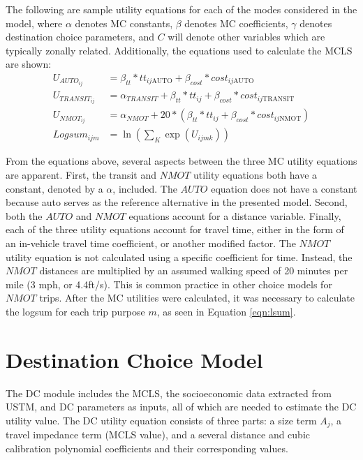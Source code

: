 The following are sample utility equations for each of the modes considered in
the model, where $\alpha$ denotes MC constants, $\beta$ denotes
MC coefficients, $\gamma$ denotes destination choice parameters, and
$C$ will denote other variables which are typically zonally related. Additionally,
the equations used to calculate the MCLS are shown:
\begin{align}
U_{{AUTO}_{ij}} &= \beta_{tt} * tt_{ij\mathrm{AUTO}} + \beta_{cost}* cost_{ij\mathrm{AUTO}} \\
U_{{TRANSIT}_{ij}} &= \alpha_{TRANSIT} + \beta_{tt} * tt_{ij} + \beta_{cost} * cost_{ij\mathrm{TRANSIT}} \\
U_{{NMOT}_{ij}} &= \alpha_{NMOT} + 20 * (\beta_{tt{}} * tt_{ij} + \beta_{cost} * cost_{ij\mathrm{NMOT}}) \\
Logsum_{ijm} &= \ln(\sum_K \exp (U_{ijmk})) \label{eqn:lsum}
\end{align}

From the equations above, several aspects between the three MC utility equations are
apparent. First, the transit and $NMOT$ utility equations both have a constant, denoted by a $\alpha$,
included. The $AUTO$ equation does not have a constant because auto serves as the reference
alternative in the presented model. Second, both the $AUTO$ and $NMOT$ equations account for a
distance variable. Finally, each of the three utility equations account for travel time, either in the
form of an in-vehicle travel time coefficient, or another modified factor. The $NMOT$ utility
equation is not calculated using a specific coefficient for time. Instead, the $NMOT$ distances are
multiplied by an assumed walking speed of 20 minutes per mile (3 mph, or 4.4ft/s). This is common practice in other
choice models for $NMOT$ trips. After the MC utilities were calculated, it was necessary to calculate the logsum for
each trip purpose \(m\), as seen in Equation \ref{eqn:lsum}.

\section{Destination Choice Model}
\label{sec:dc}
The DC module
includes the MCLS, the socioeconomic data extracted
from USTM, and DC parameters as inputs, all of which are needed to estimate the DC utility value.
The DC utility equation consists of three parts: a size term \(A_j\),
a travel impedance term (MCLS value), and a several distance and cubic
calibration polynomial coefficients and their corresponding values.

